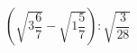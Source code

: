 \begin{ex}
	\begin{condition}
		\( \left( \sqrt{3\dfrac{6}{7}}-\sqrt{1\dfrac{5}{7}} \right):\sqrt{\dfrac{3}{28}} \)
	\end{condition}
\end{ex}